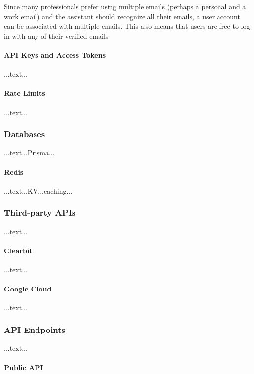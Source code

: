 \documentclass{article}
\begin{document}
Since many professionals prefer using multiple emails (perhaps a personal and a work email) and the assistant should recognize all their emails, a user account can be associated with multiple emails. This also means that users are free to log in with any of their verified emails.

\paragraph{API Keys and Access Tokens}

...text...

\paragraph{Rate Limits}

...text...

\subsubsection{Databases}

...text...Prisma...

\paragraph{Redis}

...text...KV...caching...

\subsubsection{Third-party APIs}

...text...

\paragraph{Clearbit}

...text...

\paragraph{Google Cloud}

...text...

\subsubsection{API Endpoints}

...text...

\paragraph{Public API}
\end{document}
